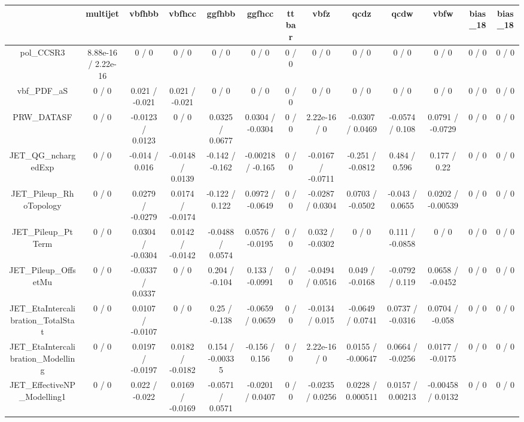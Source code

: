 \documentclass[10pt]{article}
\begin{document}
\begin{table}[htbp]
\begin{center}
\begin{tabular}{|c|c|c|c|c|c|c|c|c|c|c|c|c|}
\hline 
      & multijet      & vbfhbb      & vbfhcc      & ggfhbb      & ggfhcc      & ttbar      & vbfz      & qcdz      & qcdw      & vbfw      & bias_18      & bias_18 \\ 
\hline 
  pol_CCSR3 & 8.88e-16 / 2.22e-16 & 0 / 0 & 0 / 0 & 0 / 0 & 0 / 0 & 0 / 0 & 0 / 0 & 0 / 0 & 0 / 0 & 0 / 0 & 0 / 0 & 0 / 0 \\ 
  vbf_PDF_aS & 0 / 0 & 0.021 / -0.021 & 0.021 / -0.021 & 0 / 0 & 0 / 0 & 0 / 0 & 0 / 0 & 0 / 0 & 0 / 0 & 0 / 0 & 0 / 0 & 0 / 0 \\ 
  PRW_DATASF & 0 / 0 & -0.0123 / 0.0123 & 0 / 0 & 0.0325 / 0.0677 & 0.0304 / -0.0304 & 0 / 0 & 2.22e-16 / 0 & -0.0307 / 0.0469 & -0.0574 / 0.108 & 0.0791 / -0.0729 & 0 / 0 & 0 / 0 \\ 
  JET_QG_nchargedExp & 0 / 0 & -0.014 / 0.016 & -0.0148 / 0.0139 & -0.142 / -0.162 & -0.00218 / -0.165 & 0 / 0 & -0.0167 / -0.0711 & -0.251 / -0.0812 & 0.484 / 0.596 & 0.177 / 0.22 & 0 / 0 & 0 / 0 \\ 
  JET_Pileup_RhoTopology & 0 / 0 & 0.0279 / -0.0279 & 0.0174 / -0.0174 & -0.122 / 0.122 & 0.0972 / -0.0649 & 0 / 0 & -0.0287 / 0.0304 & 0.0703 / -0.0502 & -0.043 / 0.0655 & 0.0202 / -0.00539 & 0 / 0 & 0 / 0 \\ 
  JET_Pileup_PtTerm & 0 / 0 & 0.0304 / -0.0304 & 0.0142 / -0.0142 & -0.0488 / 0.0574 & 0.0576 / -0.0195 & 0 / 0 & 0.032 / -0.0302 & 0 / 0 & 0.111 / -0.0858 & 0 / 0 & 0 / 0 & 0 / 0 \\ 
  JET_Pileup_OffsetMu & 0 / 0 & -0.0337 / 0.0337 & 0 / 0 & 0.204 / -0.104 & 0.133 / -0.0991 & 0 / 0 & -0.0494 / 0.0516 & 0.049 / -0.0168 & -0.0792 / 0.119 & 0.0658 / -0.0452 & 0 / 0 & 0 / 0 \\ 
  JET_EtaIntercalibration_TotalStat & 0 / 0 & 0.0107 / -0.0107 & 0 / 0 & 0.25 / -0.138 & -0.0659 / 0.0659 & 0 / 0 & -0.0134 / 0.015 & -0.0649 / 0.0741 & 0.0737 / -0.0316 & 0.0704 / -0.058 & 0 / 0 & 0 / 0 \\ 
  JET_EtaIntercalibration_Modelling & 0 / 0 & 0.0197 / -0.0197 & 0.0182 / -0.0182 & 0.154 / -0.00335 & -0.156 / 0.156 & 0 / 0 & 2.22e-16 / 0 & 0.0155 / -0.00647 & 0.0664 / -0.0256 & 0.0177 / -0.0175 & 0 / 0 & 0 / 0 \\ 
  JET_EffectiveNP_Modelling1 & 0 / 0 & 0.022 / -0.022 & 0.0169 / -0.0169 & -0.0571 / 0.0571 & -0.0201 / 0.0407 & 0 / 0 & -0.0235 / 0.0256 & 0.0228 / 0.000511 & 0.0157 / 0.00213 & -0.00458 / 0.0132 & 0 / 0 & 0 / 0 \\ 

\end{tabular}
\end{center}
\end{table}
\end{document}

